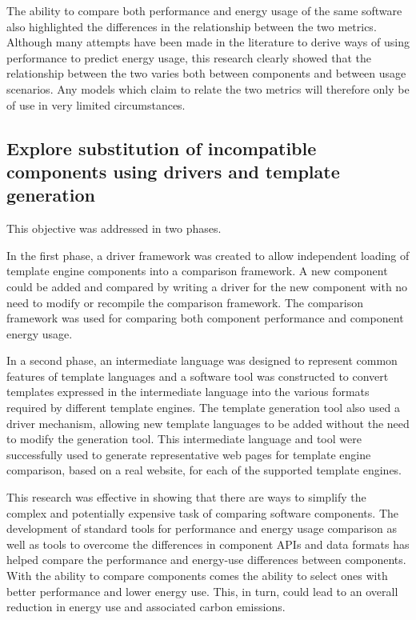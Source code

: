 The ability to compare both performance and energy usage of the same software also highlighted the differences in the relationship between the two metrics. Although many attempts have been made in the literature to derive ways of using performance to predict energy usage, this research clearly showed that the relationship between the two varies both between components and between usage scenarios. Any models which claim to relate the two metrics will therefore only be of use in very limited circumstances.

\subsection{Explore substitution of incompatible components using drivers and template generation}

This objective was addressed in two phases.

In the first phase, a driver framework was created to allow independent loading of template engine components into a comparison framework. A new component could be added and compared by writing a driver for the new component with no need to modify or recompile the comparison framework. The comparison framework was used for comparing both component performance and component energy usage.

In a second phase, an intermediate language was designed to represent common features of template languages and a software tool was constructed to convert templates expressed in the intermediate language into the various formats required by different template engines. The template generation tool also used a driver mechanism, allowing new template languages to be added without the need to modify the generation tool. This intermediate language and tool were successfully used to generate representative web pages for template engine comparison, based on a real website, for each of the supported template engines.

This research was effective in showing that there are ways to simplify the complex and potentially expensive task of comparing software components. The development of standard tools for performance and energy usage comparison as well as tools to overcome the differences in component APIs and data formats has helped compare the performance and energy-use differences between components. With the ability to compare components comes the ability to select ones with better performance and lower energy use. This, in turn, could lead to an overall reduction in energy use and associated carbon emissions.

